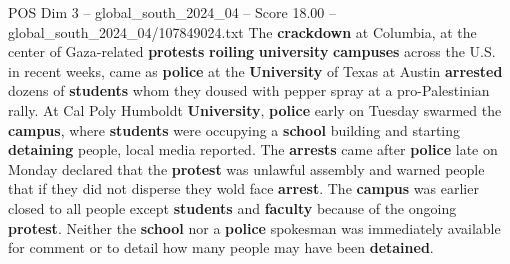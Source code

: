 \begin{textsample}{POS Dim 3 – global\_south\_2024\_04 – Score 18.00 – global\_south\_2024\_04/107849024.txt}
The \textbf{crackdown} at Columbia, at the center of Gaza-related \textbf{protests} \textbf{roiling} \textbf{university} \textbf{campuses} across the U.S. in recent weeks, came as \textbf{police} at the \textbf{University} of Texas at Austin \textbf{arrested} dozens of \textbf{students} whom they doused with pepper spray at a pro-Palestinian rally.
At Cal Poly Humboldt \textbf{University}, \textbf{police} early on Tuesday swarmed the \textbf{campus}, where \textbf{students} were occupying a \textbf{school} building and starting \textbf{detaining} people, local media reported.
The \textbf{arrests} came after \textbf{police} late on Monday declared that the \textbf{protest} was unlawful assembly and warned people that if they did not disperse they wold face \textbf{arrest}.
The \textbf{campus} was earlier closed to all people except \textbf{students} and \textbf{faculty} because of the ongoing \textbf{protest}.
Neither the \textbf{school} nor a \textbf{police} spokesman was immediately available for comment or to detail how many people may have been \textbf{detained}.

\end{textsample}
